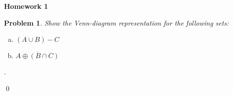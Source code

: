\documentclass[12pt]{article}
\date{Feb 14, 2012}
\newtheorem{hw}{Problem}
\newenvironment{sol}
{\par\vspace{3mm}\noindent{\it Solution}.}
{\qed}
\begin{document}
	\begin{center}
		{\LARGE\bf Homework 1}\\
		\vspace{2mm}
		
	\end{center}
	
	\begin{hw}
		Show the Venn-diagram representation for the following sets:
		
		
		\begin{enumerate}[(a)]
			\item $(A\cup B)- C$
			\item $\overline{A\oplus (B\cap C)}$
		\end{enumerate}
	\end{hw}
	\begin{sol} 
		\\
		\begin{minipage}[h]{0.45\textwidth}
			\centering
			\def\firstcircle{(0,0) circle (1.5cm)}
			\def\secondcircle{(45:2cm) circle (1.5cm)}
			\def\thirdcircle{(0:2cm) circle (1.5cm)}
			
		\end{minipage}
		\hspace{5mm}
		\begin{minipage}[h]{0.45\textwidth}
			\centering
			\def\firstcircle{(0,0) circle (1.5cm)}
			\def\secondcircle{(45:2cm) circle (1.5cm)}
			\def\thirdcircle{(0:2cm) circle (1.5cm)}
			
\end{minipage}
\end{sol}
\end{document}
